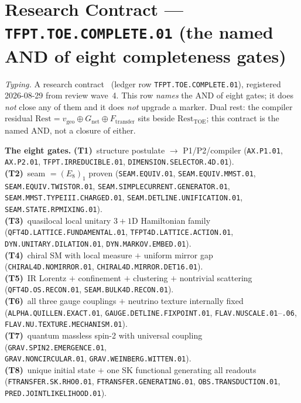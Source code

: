 \documentclass[11pt,a4paper]{article}
\begin{document}
\section*{Research Contract --- \texttt{TFPT.TOE.COMPLETE.01} (the named AND of eight completeness gates)}
\noindent\emph{Typing.} A research contract \mO\ (ledger row \texttt{TFPT.TOE.COMPLETE.01}),
registered 2026-08-29 from review wave~4.  This row \emph{names} the AND of eight gates; it does
\emph{not} close any of them and it does \emph{not} upgrade a marker.  Dual rest: the compiler
residual $\mathrm{Rest}=v_{\mathrm{geo}}\oplus G_{\mathrm{net}}\oplus F_{\mathrm{transfer}}$ sits
beside $\mathrm{Rest}_{\mathrm{TOE}}$; this contract is the named AND, not a closure of either.

\par\smallskip\noindent\textbf{The eight gates.}
\textbf{(T1)}~structure postulate $\to$ P1/P2/compiler
(\texttt{AX.P1.01}, \texttt{AX.P2.01}, \texttt{TFPT.IRREDUCIBLE.01},
\texttt{DIMENSION.SELECTOR.4D.01}).\\
\textbf{(T2)}~seam $=(E_8)_1$ proven
(\texttt{SEAM.EQUIV.01}, \texttt{SEAM.EQUIV.MMST.01}, \texttt{SEAM.EQUIV.TWISTOR.01},
\texttt{SEAM.SIMPLECURRENT.GENERATOR.01},\\
\texttt{SEAM.MMST.TYPEIII.CHARGED.01},
\texttt{SEAM.DETLINE.UNIFICATION.01},
\texttt{SEAM.STATE.RPMIXING.01}).\\
\textbf{(T3)}~quasilocal local unitary $3{+}1$D Hamiltonian family
(\texttt{QFT4D.LATTICE.FUNDAMENTAL.01}, \texttt{TFPT4D.LATTICE.ACTION.01},
\texttt{DYN.UNITARY.DILATION.01}, \texttt{DYN.MARKOV.EMBED.01}).\\
\textbf{(T4)}~chiral SM with local measure $+$ uniform mirror gap
(\texttt{CHIRAL4D.NOMIRROR.01}, \texttt{CHIRAL4D.MIRROR.DET16.01}).\\
\textbf{(T5)}~IR Lorentz $+$ confinement $+$ clustering $+$ nontrivial scattering
(\texttt{QFT4D.OS.RECON.01}, \texttt{SEAM.BULK4D.RECON.01}).\\
\textbf{(T6)}~all three gauge couplings $+$ neutrino texture internally fixed
(\texttt{ALPHA.QUILLEN.EXACT.01}, \texttt{GAUGE.DETLINE.FIXPOINT.01},
\texttt{FLAV.NUSCALE.01}--\texttt{.06}, \texttt{FLAV.NU.TEXTURE.MECHANISM.01}).\\
\textbf{(T7)}~quantum massless spin-2 with universal coupling
(\texttt{GRAV.SPIN2.EMERGENCE.01},\\
\texttt{GRAV.NONCIRCULAR.01},
\texttt{GRAV.WEINBERG.WITTEN.01}).\\
\textbf{(T8)}~unique initial state $+$ one SK functional generating all readouts
(\texttt{FTRANSFER.SK.RHO0.01}, \texttt{FTRANSFER.GENERATING.01},
\texttt{OBS.TRANSDUCTION.01}, \texttt{PRED.JOINTLIKELIHOOD.01}).
\end{document}
